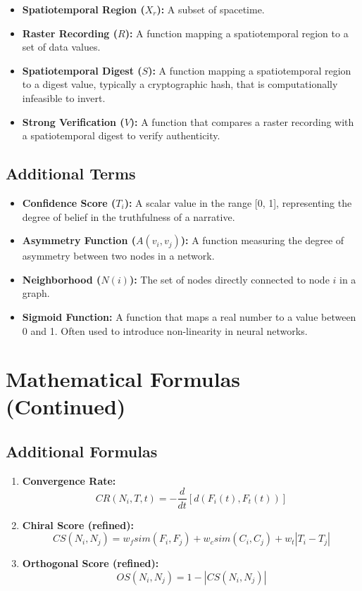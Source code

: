 \documentclass[12pt, a4paper]{article}
\begin{document}
\begin{itemize}
    \item \textbf{Spatiotemporal Region ($X_r$): } A subset of spacetime.
    \item \textbf{Raster Recording ($R$): } A function mapping a spatiotemporal region to a set of data values.
    \item \textbf{Spatiotemporal Digest ($S$): } A function mapping a spatiotemporal region to a digest value, typically a cryptographic hash, that is computationally infeasible to invert.
    \item \textbf{Strong Verification ($V$): } A function that compares a raster recording with a spatiotemporal digest to verify authenticity.
\end{itemize}

\subsection{Additional Terms}

\begin{itemize}
    \item \textbf{Confidence Score ($T_i$): } A scalar value in the range [0, 1], representing the degree of belief in the truthfulness of a narrative.
    \item \textbf{Asymmetry Function ($A(v_i, v_j)$): } A function measuring the degree of asymmetry between two nodes in a network.
    \item \textbf{Neighborhood ($N(i)$): } The set of nodes directly connected to node $i$ in a graph.
    \item \textbf{Sigmoid Function:} A function that maps a real number to a value between 0 and 1. Often used to introduce non-linearity in neural networks.
\end{itemize}



\section{Mathematical Formulas (Continued)}

\subsection{Additional Formulas}

\begin{enumerate}
    \item \textbf{Convergence Rate:}
    \[
    CR(N_i, T, t) = -\frac{d}{dt} [d(F_i(t), F_t(t))]
    \]
    \item \textbf{Chiral Score (refined): }
    \[
    CS(N_i, N_j) = w_f sim(F_i, F_j) + w_c sim(C_i, C_j) + w_t |T_i - T_j|
    \]
    \item \textbf{Orthogonal Score (refined): }
    \[
    OS(N_i, N_j) = 1 - |CS(N_i, N_j)|
    \]
\end{enumerate}
\end{document}
